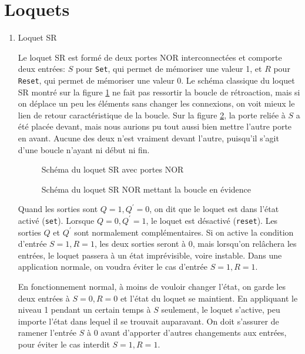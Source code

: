 \documentclass[letter, oneside]{book}
\begin{document}
\section{Loquets}
\label{sec:org6f9fa48}

\begin{enumerate}
\item Loquet SR
\label{sec:orgfa1c0ff}

Le loquet SR est formé de deux portes NOR interconnectées et comporte
deux entrées: \(S\) pour \texttt{Set}, qui permet de mémoriser une valeur 1,
et \(R\) pour \texttt{Reset}, qui permet de mémoriser une valeur 0. Le schéma
classique du loquet SR montré sur la figure \ref{fig:org47c0f6a} ne fait pas
ressortir la boucle de rétroaction, mais si on déplace un peu les
éléments sans changer les connexions, on voit mieux le lien de retour
caractéristique de la boucle. Sur la figure \ref{fig:org534515c}, la porte reliée
à \(S\) a été placée devant, mais nous aurions pu tout aussi bien
mettre l'autre porte en avant. Aucune des deux n'est vraiment devant
l'autre, puisqu'il s'agit d'une boucle n'ayant ni début ni fin.

\begin{figure}[htbp]
\centering

\caption{\label{fig:org47c0f6a}Schéma du loquet SR avec portes NOR}
\end{figure}


\begin{figure}[htbp]
\centering

\caption{\label{fig:org534515c}Schéma du loquet SR NOR mettant la boucle en évidence}
\end{figure}

Quand les sorties sont \(Q=1, Q^\prime=0\), on dit que le loquet est
dans l'état activé (\texttt{set}). Lorsque \(Q=0, Q^\prime=1\), le loquet
est désactivé (\texttt{reset}). Les sorties \(Q\) et \(Q^\prime\) sont
normalement complémentaires. Si on active la condition d'entrée \(S=1,
R=1\), les deux sorties seront à 0, mais lorsqu'on relâchera les
entrées, le loquet passera à un état imprévisible, voire
instable. Dans une application normale, on voudra éviter le cas
d'entrée \(S=1, R=1\). 

En fonctionnement normal, à moins de vouloir changer l'état, on garde
les deux entrées à \(S=0, R=0\) et l'état du loquet se maintient. En
appliquant le niveau 1 pendant un certain temps à \(S\) seulement, le
loquet s'active, peu importe l'état dans lequel il se trouvait
auparavant. On doit s'assurer de ramener l'entrée \(S\) à 0 avant
d'apporter d'autres changements aux entrées, pour éviter le cas
interdit \(S=1, R=1\).


\end{enumerate}
\end{document}
